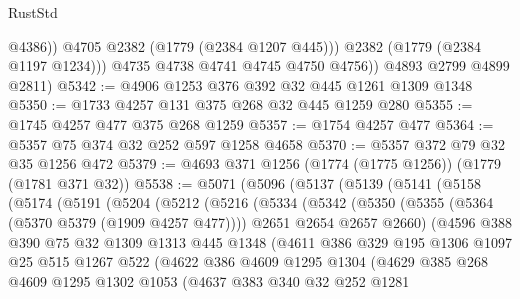 \begin{lexlean}{RustStd}
\begin{coremodule}
{\begin{coremodule}
{{{{{{{{{{{                  @4386))
              @4705
              @2382
              (@1779 (@2384 @1207 @445)))
            @2382
            (@1779 (@2384 @1197 @1234)))
          @4735
          @4738
          @4741
          @4745
          @4750
          @4756))
      @4893
      @2799
      @4899
      @2811)
@5342 := @4906 @1253 @376 @392 @32 @445 @1261 @1309 @1348
@5350 := @1733 @4257 @131 @375 @268 @32 @445 @1259 @280
@5355 := @1745 @4257 @477 @375 @268 @1259
@5357 := @1754 @4257 @477
@5364 := @5357 @75 @374 @32 @252 @597 @1258 @4658
@5370 := @5357 @372 @79 @32 @35 @1256 @472
@5379 := @4693 @371 @1256 (@1774 (@1775 @1256)) (@1779 (@1781 @371 @32))
@5538 := @5071
    (@5096
      (@5137
        (@5139
          (@5141
            (@5158
              (@5174
                (@5191
                  (@5204
                    (@5212
                      (@5216
                        (@5334
                          (@5342
                            (@5350
                              (@5355 (@5364 (@5370 @5379 (@1909 @4257 @477))))
                              @2651
                              @2654
                              @2657
                              @2660)
                            (@4596
                              @388
                              @390
                              @75
                              @32
                              @1309
                              @1313
                              @445
                              @1348
                              (@4611
                                @386
                                @329
                                @195
                                @1306
                                @1097
                                @25
                                @515
                                @1267
                                @522
                                (@4622
                                  @386
                                  @4609
                                  @1295
                                  @1304
                                  (@4629
                                    @385
                                    @268
                                    @4609
                                    @1295
                                    @1302
                                    @1053
                                    (@4637
                                      @383
                                      @340
                                      @32
                                      @252
                                      @1281
}}}}}}}}}}}
\end{coremodule}}
\end{coremodule}
\end{lexlean}

